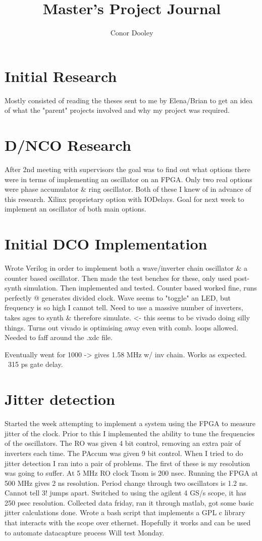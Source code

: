 \documentclass[a4paper,12pt]{report}
\begin{document}
\title{Master's Project Journal}
\author{Conor Dooley}
\maketitle
\section*{Initial Research}
Mostly consisted of reading the theses sent to me by Elena/Brian to get an idea of what the "parent" projects involved and why my project was required.
\section*{D/NCO Research}
After 2nd meeting with supervisors the goal was to find out what options there were in terms of implementing an oscillator on an FPGA. Only two real options were phase accumulator \& ring oscillator. Both of these I knew of in advance of this research. Xilinx proprietary option with IODelays. Goal for next week to implement an oscillator of both main options.
\section*{Initial DCO Implementation}
Wrote Verilog in order to implement both a wave/inverter chain oscillator \& a counter based oscillator. Then made the test benches for these, only used post-synth simulation. Then implemented and tested. Counter based worked fine, runs perfectly @ generates divided clock. Wave seems to "toggle" an LED, but frequency is so high I cannot tell. Need to use a massive number of inverters, takes ages to synth \& therefore simulate. <- this seems to be vivado doing silly things. Turns out vivado is optimising away even with comb. loops allowed. Needed to faff around the .xdc file.

Eventually went for 1000 -> gives 1.58 MHz w/ inv chain. Works as expected. ~315 ps gate delay.
\section*{Jitter detection}
Started the week attempting to implement a system using the FPGA to measure jitter of the clock. Prior to this I implemented the ability to tune the frequencies of the oscillators. The RO was given 4 bit control, removing an extra pair of inverters each time. The PAccum was given 9 bit control.
When I tried to do jitter detection I ran into a pair of problems. The first of these is my resolution was going to suffer.
At 5 MHz RO clock Tnom is 200 nsec. Running the FPGA at 500 MHz gives 2 ns resolution. Period change through two oscillators is 1.2 ns. Cannot tell 3! jumps apart.
Switched to using the agilent 4 GS/s scope, it has 250 psec resolution.
Collected data friday, ran it through matlab, got some basic jitter calculations done.
Wrote a bash script that implements a GPL c library that interacts with the scope over ethernet.
Hopefully it works and can be used to automate datacapture process
Will test Monday.
\end{document}
